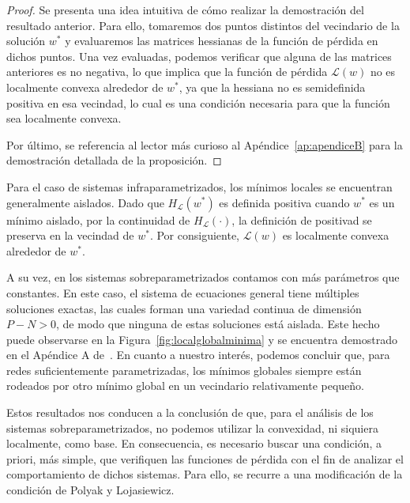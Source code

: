 \begin{proof}
    Se presenta una idea intuitiva de cómo realizar la demostración del resultado anterior. Para ello, tomaremos dos puntos distintos del vecindario de la solución $w^*$ y evaluaremos las matrices hessianas de la función de pérdida en dichos puntos. Una vez evaluadas, podemos verificar que alguna de las matrices anteriores es no negativa, lo que implica que la función de pérdida $\mathcal{L}(w)$ no es localmente convexa alrededor de $w^*$, ya que la hessiana no es semidefinida positiva en esa vecindad, lo cual es una condición necesaria para que la función sea localmente convexa.\newline

    Por último, se referencia al lector más curioso al Apéndice~\ref{ap:apendiceB} para la demostración detallada de la proposición.\newline
\end{proof}

Para el caso de sistemas infraparametrizados, los mínimos locales se encuentran generalmente aislados. Dado que $H_{\mathcal{L}}(w^{*})$ es definida positiva cuando $w^{*}$ es un mínimo aislado, por la continuidad de $H_{\mathcal{L}}(\cdot)$, la definición de positivad se preserva en la vecindad de $w^{*}$. Por consiguiente, $\mathcal{L}(w)$ es localmente convexa alrededor de $w^{*}$.\newline

A su vez, en los sistemas sobreparametrizados contamos con más parámetros que constantes. En este caso, el sistema de ecuaciones general tiene múltiples soluciones exactas, las cuales forman una variedad continua de dimensión $P - N > 0$, de modo que ninguna de estas soluciones está aislada. Este hecho puede observarse en la Figura~\ref{fig:localglobalminima} y se encuentra demostrado en el Apéndice A de~\cite{Liu2021}. En cuanto a nuestro interés, podemos concluir que, para redes suficientemente parametrizadas, los mínimos globales siempre están rodeados por otro mínimo global en un vecindario relativamente pequeño.\newline

Estos resultados nos conducen a la conclusión de que, para el análisis de los sistemas sobreparametrizados, no podemos utilizar la convexidad, ni siquiera localmente, como base. En consecuencia, es necesario buscar una condición, a priori, más simple, que verifiquen las funciones de pérdida con el fin de analizar el comportamiento de dichos sistemas. Para ello, se recurre a una modificación de la condición de Polyak y Lojasiewicz.\newline


